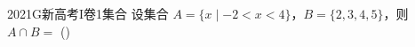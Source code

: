 
\begin{problem}{2021}{G}{新高考I卷}{1}{集合}
设集合 $ A=\{x\mid -2<x<4\} $，$ B=\{2,3,4,5\} $，则 $ A\cap B= $ (\hspace{1cm})
\end{problem}

\begin{choices}
\end{choices}